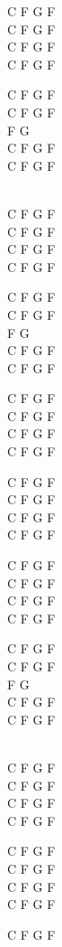 \begin{chord}
C F G F\\
C F G F\\
C F G F\\
C F G F

C F G F\\
C F G F\\
F G\\
C F G F\\
C F G F

\vin \\
C F G F\\
C F G F\\
C F G F\\
C F G F

C F G F\\
C F G F\\
F G\\
C F G F\\
C F G F

C F G F\\
C F G F\\
C F G F\\
C F G F

C F G F\\
C F G F\\
C F G F\\
C F G F

C F G F\\
C F G F\\
C F G F\\
C F G F

C F G F\\
C F G F\\
F G\\
C F G F\\
C F G F

\vin \\
C F G F\\
C F G F\\
C F G F\\
C F G F

C F G F\\
C F G F\\
C F G F\\
C F G F

C F G F
\end{chord}
